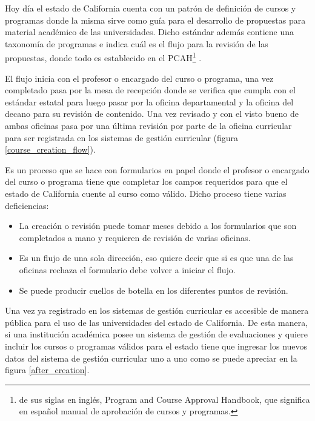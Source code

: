Hoy día el estado de California cuenta con un patrón de definición de cursos y programas donde la misma sirve como guía para el desarrollo de propuestas para material académico de las universidades. Dicho estándar además contiene una taxonomía de programas e indica cuál es el flujo para la revisión de las propuestas, donde todo es establecido en el PCAH\footnote{de sus siglas en inglés, Program and Course Approval Handbook, que significa en español manual de aprobación de cursos y programas.} \citep{brice_w_harris_program_2013}.

El flujo inicia con el profesor o encargado del curso o programa, una vez completado pasa por la mesa de recepción donde se verifica que cumpla con el estándar estatal para luego pasar por la oficina departamental y la oficina del decano para su revisión de contenido. Una vez revisado y con el visto bueno de ambas oficinas pasa por una última revisión por parte de la oficina curricular para ser registrada en los sistemas de gestión curricular (figura \ref{course_creation_flow}).

Es un proceso que se hace con formularios en papel donde el profesor o encargado del curso o programa tiene que completar los campos requeridos para que el estado de California cuente al curso como válido. Dicho proceso tiene varias deficiencias:
\begin{itemize}
	\item La creación o revisión puede tomar meses debido a los formularios que son completados a mano y requieren de revisión de varias oficinas.
	\item Es un flujo de una sola dirección, eso quiere decir que si es que una de las oficinas rechaza el formulario debe volver a iniciar el flujo.
	\item Se puede producir cuellos de botella en los diferentes puntos de revisión.
\end{itemize}

Una vez ya registrado en los sistemas de gestión curricular es accesible de manera pública para el uso de las universidades del estado de California. De esta manera, si una institución académica posee un sistema de gestión de evaluaciones y quiere incluir los cursos o programas válidos para el estado tiene que ingresar los nuevos datos del sistema de gestión curricular uno a uno como se puede apreciar en la figura \ref{after_creation}.


